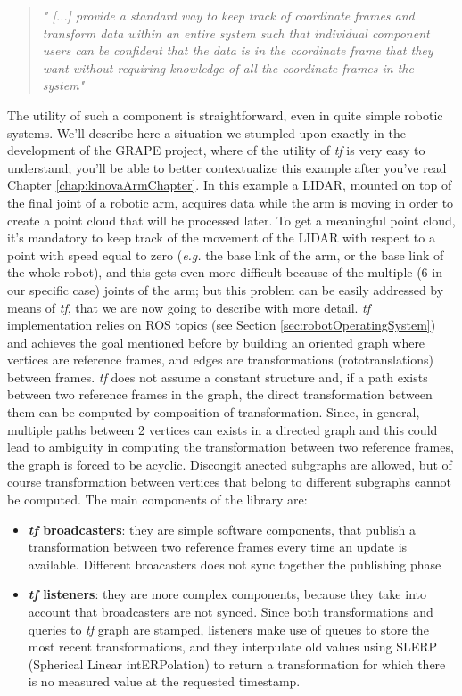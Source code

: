 \blockquote{
\textit{" [...] provide a standard way to keep track of coordinate frames and transform data within an entire system such that individual component users can be confident that the data is in the coordinate frame that they want without requiring knowledge of all the coordinate
frames in the system" \parencite{tfPaper}}
}
The utility of such a component is straightforward, even in quite simple robotic systems. We'll describe here a situation we stumpled upon exactly in the development of the \ac{GRAPE} project, where of the utility of \textit{tf} is very easy to understand; you'll be able to better contextualize this example after you've read Chapter \ref{chap:kinovaArmChapter}. In this example a \ac{LIDAR}, mounted on top of the final joint of a robotic arm, acquires data while the arm is moving in order to create a point cloud that will be processed later. To get a meaningful point cloud, it's mandatory to keep track of the movement of the \ac{LIDAR} with respect to a point with speed equal to zero (\textit{e.g.} the base link of the arm, or the base link of the whole robot), and this gets even more difficult because of the multiple (6 in our specific case) joints of the arm; but this problem can be easily addressed by means of \textit{tf}, that we are now going to describe with more detail. 
\textit{tf} implementation relies on \ac{ROS} topics (see Section \ref{sec:robotOperatingSystem}) and achieves the goal mentioned before by building an oriented graph where vertices are reference frames, and edges are transformations (rototranslations) between frames. \textit{tf} does not assume a constant structure and, if a path exists between two reference frames in the graph, the direct transformation between them can be computed by composition of transformation. Since, in general, multiple paths between 2 vertices can exists in a directed graph and this could lead to ambiguity in computing the transformation between two reference frames, the graph is forced to be acyclic. Discongit anected subgraphs are allowed, but of course transformation between vertices that belong to different subgraphs cannot be computed. 
The main components of the library are:
\begin{itemize}
	\item \textbf{\textit{tf} broadcasters}: they are simple software components, that publish a transformation between two reference frames every time an update is available. Different broacasters does not sync together the publishing phase
	\item \textbf{\textit{tf} listeners}: they are more complex components, because they take into account that broadcasters are not synced. Since both transformations and queries to \textit{tf} graph are stamped, listeners make use of queues to store the most recent transformations, and they  interpulate old values using SLERP (Spherical Linear intERPolation) to return a transformation for which there is no measured value at the requested timestamp.
\end{itemize}

